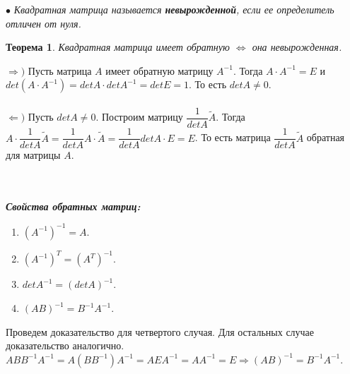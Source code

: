 $\bullet$ \textit{Квадратная матрица называется \textbf{невырожденной}, если ее определитель отличен от нуля.}
\newtheorem*{th9_5_1}{Теорема}\begin{th9_5_1}
	Квадратная матрица имеет обратную $\Longleftrightarrow$ она невырожденная.
\end{th9_5_1}\begin{Proof}
	$\Rightarrow)$ Пусть матрица $A$ имеет обратную матрицу $A^{-1}$. Тогда $A\cdot A^{-1} = E$ и $det(A\cdot A^{-1}) = detA \cdot detA^{-1} = det E = 1$. То есть $detA \ne 0$.\\\\
	$\Leftarrow)$ Пусть $det A \ne 0$. Построим матрицу $\dfrac{1}{detA}\widetilde{A}$. Тогда $A\cdot \dfrac{1}{detA}\widetilde{A} = \dfrac{1}{detA}A\cdot\widetilde{A} = \dfrac{1}{detA}detA\cdot E = E$. То есть матрица $\dfrac{1}{detA}\widetilde{A}$ обратная для матрицы $A$.
\end{Proof}\\\\
\textbf{\textit{Свойства обратных матриц:}}\begin{enumerate}
	\item $(A^{-1})^{-1} = A.$
	\item $(A^{-1})^T = (A^T)^{-1}.$
	\item $detA^{-1} = (detA)^{-1}.$
	\item $(AB)^{-1} = B^{-1}A^{-1}.$
\end{enumerate}\begin{Proof}
	Проведем доказательство для четвертого случая. Для остальных случае доказательство аналогично. $ABB^{-1}A^{-1} = A(BB^{-1})A^{-1} = AEA^{-1} = AA^{-1} = E\Rightarrow (AB)^{-1} = B^{-1}A^{-1}.$
\end{Proof}

